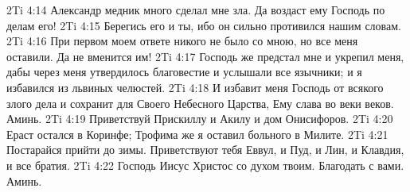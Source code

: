 \vs 2Ti 4:14 Александр медник много сделал мне зла. Да воздаст ему Господь по делам его!
\vs 2Ti 4:15 Берегись его и ты, ибо он сильно противился нашим словам.
\rsbpar\vs 2Ti 4:16 При первом моем ответе никого не было со мною, но все меня оставили. Да не вменится им!
\vs 2Ti 4:17 Господь же предстал мне и укрепил меня, дабы через меня утвердилось благовестие и услышали все язычники; и я избавился из львиных челюстей.
\vs 2Ti 4:18 И избавит меня Господь от всякого злого дела и сохранит для Своего Небесного Царства, Ему слава во веки веков. Аминь.
\rsbpar\vs 2Ti 4:19 Приветствуй Прискиллу и Акилу и дом Онисифоров.
\vs 2Ti 4:20 Ераст остался в Коринфе; Трофима же я оставил больного в Милите.
\vs 2Ti 4:21 Постарайся прийти до зимы. Приветствуют тебя Еввул, и Пуд, и Лин, и Клавдия, и все братия.
\rsbpar\vs 2Ti 4:22 Господь Иисус Христос со духом твоим. Благодать с вами. Аминь.
